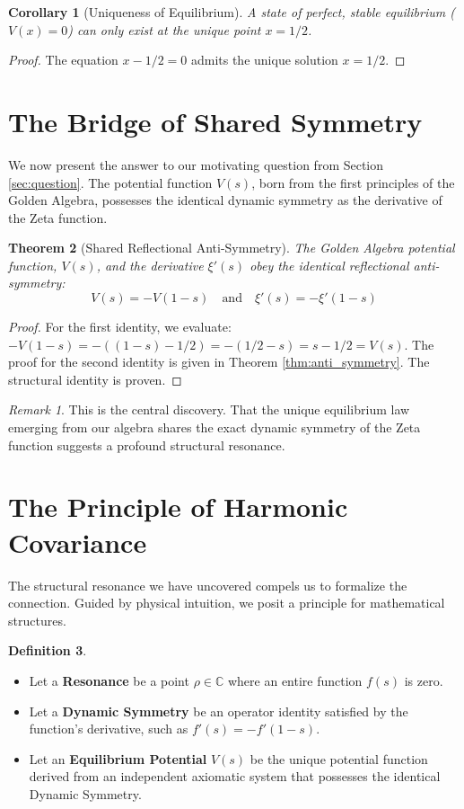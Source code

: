 \documentclass{article}
\theoremstyle{plain}
\newtheorem{theorem}{Theorem}[section]
\newtheorem{corollary}[theorem]{Corollary}
\theoremstyle{definition}
\newtheorem{definition}[theorem]{Definition}
\theoremstyle{remark}
\newtheorem*{remark}{Remark}
\begin{document}
\begin{corollary}[Uniqueness of Equilibrium]
A state of perfect, stable equilibrium ($V(x)=0$) can only exist at the unique point $x=1/2$.
\end{corollary}
\begin{proof}
The equation $x - 1/2 = 0$ admits the unique solution $x=1/2$.
\end{proof}

\section{The Bridge of Shared Symmetry}
\label{sec:bridge}
We now present the answer to our motivating question from Section \ref{sec:question}. The potential function $V(s)$, born from the first principles of the Golden Algebra, possesses the identical dynamic symmetry as the derivative of the Zeta function.

\begin{theorem}[Shared Reflectional Anti-Symmetry]
The Golden Algebra potential function, $V(s)$, and the derivative $\xi'(s)$ obey the identical reflectional anti-symmetry:
$$ V(s) = -V(1-s) \quad \text{and} \quad \xi'(s) = -\xi'(1-s) $$
\end{theorem}
\begin{proof}
For the first identity, we evaluate: $-V(1-s) = -((1-s) - 1/2) = -(1/2 - s) = s - 1/2 = V(s)$. The proof for the second identity is given in Theorem \ref{thm:anti_symmetry}. The structural identity is proven.
\end{proof}

\begin{remark}
This is the central discovery. That the unique equilibrium law emerging from our algebra shares the exact dynamic symmetry of the Zeta function suggests a profound structural resonance.
\end{remark}

\section{The Principle of Harmonic Covariance}
\label{sec:covariance}
The structural resonance we have uncovered compels us to formalize the connection. Guided by physical intuition, we posit a principle for mathematical structures.

\begin{definition}
\begin{itemize}
    \item Let a \textbf{Resonance} be a point $\rho \in \mathbb{C}$ where an entire function $f(s)$ is zero.
    \item Let a \textbf{Dynamic Symmetry} be an operator identity satisfied by the function's derivative, such as $f'(s) = -f'(1-s)$.
    \item Let an \textbf{Equilibrium Potential} $V(s)$ be the unique potential function derived from an independent axiomatic system that possesses the identical Dynamic Symmetry.
\end{itemize}
\end{definition}
\end{document}
